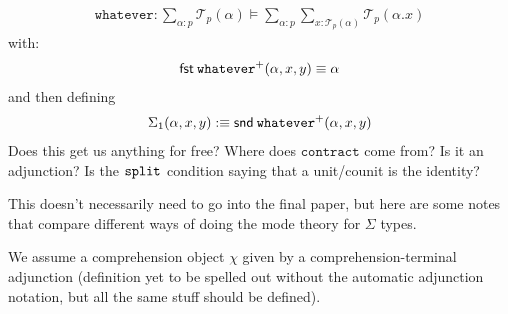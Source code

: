 \documentclass[10pt]{article}
\theoremstyle{definition}
\newcommand\dsd[1]{\ensuremath{\mathsf{#1}}}
\newcommand{\app}[2]{\ensuremath{#1 \: #2}}
\newcommand{\fst}[1]{\app{\dsd{fst}}{#1}}
\newcommand{\snd}[1]{\app{\dsd{snd}}{#1}}
\newcommand\TrPlus[2]{\ensuremath{{#1}^+(#2)}}
\newcommand\El[2]{\mathcal{T}_{#1}(#2)}
\begin{document}

\begin{align*}
\mathtt{whatever} : \sum_{\alpha : p} \El{p}{\alpha} \vDash \sum_{\alpha : p} \sum_{x : \El{p}{\alpha}} \El{p}{\alpha.x}
\end{align*}
with: 
\begin{align*}
\fst \TrPlus{\mathtt{whatever}}{\alpha, x, y} \equiv \alpha
\end{align*}
and then defining
\begin{align*}
\Sigma_1(\alpha, x, y) :\equiv \snd \TrPlus{\mathtt{whatever}}{\alpha, x, y} 
\end{align*}
Does this get us anything for free? Where does $\mathtt{contract}$ come from? Is it an adjunction? Is the $\mathtt{split}_{}$ condition saying that a unit/counit is the identity?
 

This doesn't necessarily need to go into the final paper, but here are
some notes that compare different ways of doing the mode theory for
$\Sigma$ types.

We assume a comprehension object $\chi$ given by a
comprehension-terminal adjunction (definition yet to be spelled out
without the automatic adjunction notation, but all the same stuff should
be defined).
\end{document}
